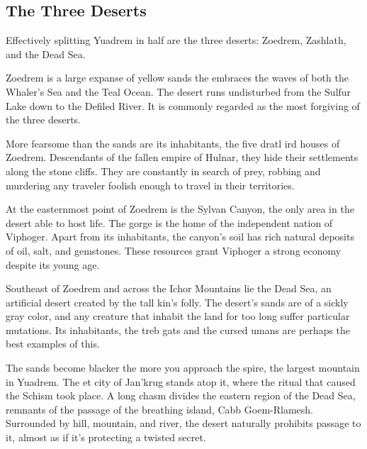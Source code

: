 

\subsection*{The Three Deserts} \label{ssec::threedeserts}
Effectively splitting Yuadrem in half are the three deserts: Zoedrem, Zashlath, and the Dead Sea.

Zoedrem is a large expanse of yellow sands the embraces the waves of both the Whaler's Sea and the Teal Ocean.
The desert runs undisturbed from the Sulfur Lake down to the Defiled River.
It is commonly regarded as the most forgiving of the three deserts.

More fearsome than the sands are its inhabitants, the five dratl ird houses of Zoedrem.
Descendants of the fallen empire of Hulnar, they hide their settlements along the stone cliffs.
They are constantly in search of prey, robbing and murdering any traveler foolish enough to travel in their territories.

At the easternmost point of Zoedrem is the Sylvan Canyon, the only area in the desert able to host life.
The gorge is the home of the independent nation of Viphoger.
Apart from its inhabitants, the canyon's soil has rich natural deposits of oil, salt, and gemstones.
These resources grant Viphoger a strong economy despite its young age.

Southeast of Zoedrem and across the Ichor Mountains lie the Dead Sea, an artificial desert created by the tall kin's folly.
The desert's sands are of a sickly gray color, and any creature that inhabit the land for too long suffer particular mutations.
Its inhabitants, the treb gats and the cursed umans are perhaps the best examples of this.

The sands become blacker the more you approach the spire, the largest mountain in Yuadrem.
The et city of Jan'krug stands atop it, where the ritual that caused the Schism took place.
A long chasm divides the eastern region of the Dead Sea, remnants of the passage of the breathing island, Cabb Goem-Rlamesh.
Surrounded by hill, mountain, and river, the desert naturally prohibits passage to it, almost as if it's protecting a twisted secret.

